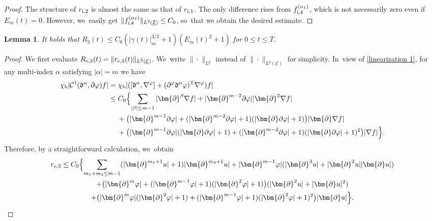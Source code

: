 \documentclass[10pt]{amsart}
\newcommand{\cI}{{\mathcal I}}
\newcommand{\cE}{{\mathcal E}}
\newcommand{\ul}[1]{\underline{#1}}
\newtheorem{lemma}[theorem]{Lemma}
\theoremstyle{definition}
\begin{document}
\begin{proof}
The structure of $r_{{\rm i},2}$ is almost the same as that of $r_{{\rm i},1}$.
The only difference rises from $f_{{\rm i},4}^{(\alpha_I)}$, which is not necessarily zero even if $E_m(t)=0$.
However, we~easily get $\|f_{{\rm i},4}^{(\alpha_I)}\|_{L^2(\ul{\cI})} \leq C_0$, so~that we obtain the desired estimate.
\end{proof}

\begin{lemma}\label{lem:EstR3}
It holds that $R_3(t) \leq C_0(|\gamma(t)|_m^{3/2}+1)(E_m(t)^2+1)$ for $0\leq t\leq T$.
\end{lemma}

\begin{proof}
We first evaluate $R_{{\rm e},3}(t)=\|r_{{\rm e},3}(t)\|_{L^2(\ul{\cE})}$. We~write $\|\cdot\|_{L^p}$ instead of $\|\cdot\|_{L^p(\ul{\cE})}$ for simplicity. In~view of \eqref{linearization 1}, for any multi-index $\alpha$ satisfying $|\alpha|=m$ we have
\begin{align*}
\chi_\mathrm{b}|{\mathcal C}^1(\mathfrak{d}^\alpha,\partial \varphi)f|
&= \chi_\mathrm{b}|([\mathfrak{d}^\alpha,\nabla^\varphi]+(\partial^\varphi\mathfrak{d}^\alpha\varphi)^{\rm T}\nabla^\varphi)f| \\
&\leq C_0 \Bigl\{ \sum_{|\beta|\leq m-1}|\bm{\partial}^\beta\nabla f| + |\bm{\partial}^{m-2}\partial\varphi||\bm{\partial}^2\nabla f| \\
&\quad\;
+ \bigl(|\bm{\partial}^{m-1}\partial\varphi| + (|\bm{\partial}^{m-2}\partial\varphi|+1)(|\bm{\partial}\partial\varphi|+1) \bigr)|\bm{\partial}\nabla f| \\
&\quad\;
+ \bigl(|\bm{\partial}^{m-1}\partial\varphi|(|\bm{\partial}\partial\varphi|+1)
+ (|\bm{\partial}^{m-2}\partial\varphi|+1)(|\bm{\partial}\partial\varphi|+1)^2 \bigr) |\nabla f| \Bigr\}.
\end{align*}
Therefore, by a straightforward calculation, we~obtain
\begin{multline*}
r_{{\rm e},3}
\leq C_0 \Bigl\{ \sum_{m_1+m_2\leq m-1}(|\bm{\partial}^{m_1+1}u|+1)|\bm{\partial}^{m_2+1}u|
+ |\bm{\partial}^{m-1}\varphi|(|\bm{\partial}^3u| + |\bm{\partial}^2u||\bm{\partial}u|) \\
+ \bigl(|\bm{\partial}^m\varphi| + (|\bm{\partial}^{m-1}\varphi|+1)(|\bm{\partial}^2\varphi|+1) \bigr)(|\bm{\partial}^2u|+|\bm{\partial}u|^2) \\
+ \bigl(|\bm{\partial}^m\varphi|(|\bm{\partial}^2\varphi|+1) + (|\bm{\partial}^{m-1}\varphi|+1)(|\bm{\partial}^2\varphi|+1)^2 \bigr) |\bm{\partial}u| \Bigr\}.
\end{multline*}


\end{proof}
\end{document}

